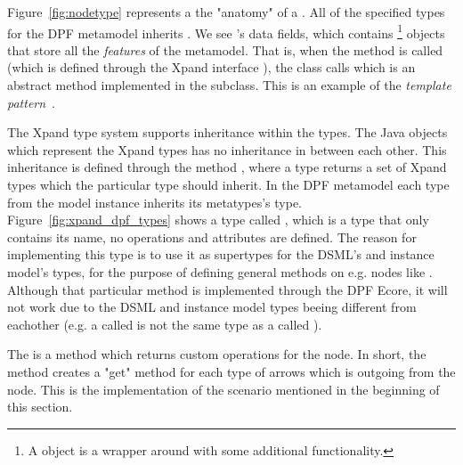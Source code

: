 Figure~\ref{fig:nodetype} represents a the "anatomy" of a . All of the specified types for the DPF metamodel inherits . We see 's data fields, which contains \footnote{A  object is a wrapper around  with some additional functionality.} objects that store all the \emph{features} of the metamodel. That is, when the method  is called (which is defined through the Xpand interface ), the class calls  which is an abstract method implemented in the subclass. This is an example of the \emph{template pattern}~\cite{Martin:2003:ASD:515230}.

The Xpand type system supports inheritance within the types. The Java objects which represent the Xpand types has no inheritance in between each other. This inheritance is defined through the method , where a type returns a set of Xpand types which the particular type should inherit. In the DPF metamodel each type from the model instance inherits its metatypes's type. Figure~\ref{fig:xpand_dpf_types} shows a type called , which is a type that only contains its name, no operations and attributes are defined. The reason for implementing this type is to use it as supertypes for the DSML's and instance model's types, for the purpose of defining general methods on e.g. nodes like . Although that particular method is implemented through the DPF Ecore, it will not work due to the DSML and instance model types beeing different from eachother (e.g. a  called  is not the same type as a  called ).

The  is a method which returns custom operations for the node. In short, the method creates a "get" method for each type of arrows which is outgoing from the node. This is the implementation of the scenario mentioned in the beginning of this section.

% 

